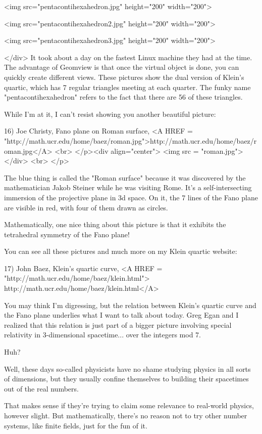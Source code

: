 <img src="pentacontihexahedron.jpg" height="200" width="200">


<img src="pentacontihexahedron2.jpg" height="200" width="200">


<img src="pentacontihexahedron3.jpg" height="200" width="200">


</div>
It took about a day on the fastest Linux machine they had at the time.  The 
advantage of Geomview is that once the virtual object is done, you can 
quickly create different views.  These pictures show the dual version of 
Klein's quartic, which has 7 regular triangles meeting at each quarter.  
The funky name "pentacontihexahedron" 
refers to the fact that there are 56
of these triangles.

While I'm at it, I can't resist showing you another beautiful picture: 

16) Joe Christy, Fano plane on Roman surface, 
    <A HREF = 
"http://math.ucr.edu/home/baez/roman.jpg">http://math.ucr.edu/home/baez/roman.jpg</A>
<br>
</p><div align="center">
<img src = "roman.jpg">
</div>
<br>
</p>


The blue thing is called the "Roman surface" 
because it was discovered 
by the mathematician Jakob Steiner while he was visiting Rome.  It's a 
self-intersecting immersion of the projective plane in 3d space.  On it, 
the 7 lines of the Fano plane are visible in red, with four of them drawn 
as circles.  

Mathematically, one nice thing about this picture is that it exhibits the 
tetrahedral symmetry of the Fano plane!  

You can see all these pictures and much more on my Klein quartic website:

17) John Baez, Klein's quartic curve, <A HREF = 
"http://math.ucr.edu/home/baez/klein.html">
http://math.ucr.edu/home/baez/klein.html</A>

You may think I'm digressing, but the relation between Klein's quartic curve and 
the Fano plane underlies what I want to talk about today.  Greg Egan and I 
realized that this relation is just part of a bigger picture involving special 
relativity in 3-dimensional spacetime... over the integers mod 7.

Huh?

Well, these days so-called physicists have no shame studying physics in all sorts 
of dimensions, but they usually confine themselves to building their spacetimes 
out of the real numbers.

That makes sense if they're trying to claim some relevance to real-world physics,
however slight.   But mathematically, there's no reason not to try other number 
systems, like finite fields, just for the fun of it.  

